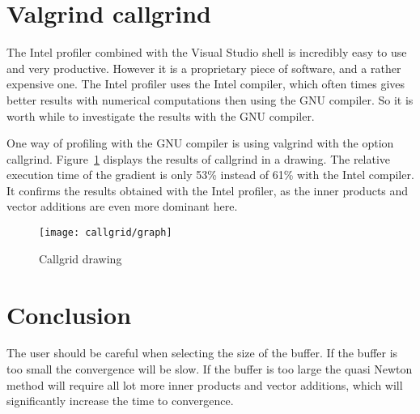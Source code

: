 \section{Valgrind callgrind}
The Intel profiler combined with the Visual Studio shell is incredibly easy to use and very productive. However it is a proprietary piece of software, and a rather expensive one. The Intel profiler uses the Intel compiler, which often times gives better results with numerical computations then using the GNU compiler. So it is worth while to investigate the results with the GNU compiler.

One way of profiling with the GNU compiler is using valgrind with the option callgrind. Figure~\ref{fig:callgrid} displays the results of callgrind in a drawing. The relative execution time of the gradient is only 53\% instead of 61\% with the Intel compiler. It confirms the results obtained with the Intel profiler, as the inner products and vector additions are even more dominant here.

\begin{figure}[H]
	\centering
	\texttt{[image: callgrid/graph]}
	\caption{Callgrid drawing}
	\label{fig:callgrid}
\end{figure}

\section{Conclusion}
The user should be careful when selecting the size of the buffer. If the buffer is too small the convergence will be slow. If the buffer is too large the quasi Newton method will require all lot more inner products and vector additions, which will significantly increase the time to convergence.
